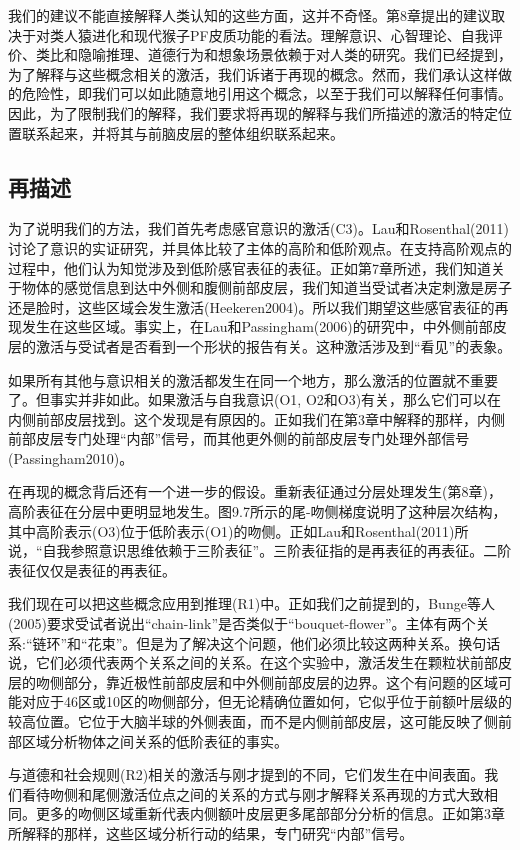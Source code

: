 我们的建议不能直接解释人类认知的这些方面，这并不奇怪。第8章提出的建议取决于对类人猿进化和现代猴子PF皮质功能的看法。理解意识、心智理论、自我评价、类比和隐喻推理、道德行为和想象场景依赖于对人类的研究。我们已经提到，为了解释与这些概念相关的激活，我们诉诸于再现的概念。然而，我们承认这样做的危险性，即我们可以如此随意地引用这个概念，以至于我们可以解释任何事情。因此，为了限制我们的解释，我们要求将再现的解释与我们所描述的激活的特定位置联系起来，并将其与前脑皮层的整体组织联系起来。

\subsection{再描述}

为了说明我们的方法，我们首先考虑感官意识的激活(C3)。Lau和Rosenthal(2011)讨论了意识的实证研究，并具体比较了主体的高阶和低阶观点。在支持高阶观点的过程中，他们认为知觉涉及到低阶感官表征的表征。正如第7章所述，我们知道关于物体的感觉信息到达中外侧和腹侧前部皮层，我们知道当受试者决定刺激是房子还是脸时，这些区域会发生激活(Heekeren2004)。所以我们期望这些感官表征的再现发生在这些区域。事实上，在Lau和Passingham(2006)的研究中，中外侧前部皮层的激活与受试者是否看到一个形状的报告有关。这种激活涉及到“看见”的表象。

如果所有其他与意识相关的激活都发生在同一个地方，那么激活的位置就不重要了。但事实并非如此。如果激活与自我意识(O1, O2和O3)有关，那么它们可以在内侧前部皮层找到。这个发现是有原因的。正如我们在第3章中解释的那样，内侧前部皮层专门处理“内部”信号，而其他更外侧的前部皮层专门处理外部信号(Passingham2010)。

在再现的概念背后还有一个进一步的假设。重新表征通过分层处理发生(第8章)，高阶表征在分层中更明显地发生。图9.7所示的尾-吻侧梯度说明了这种层次结构，其中高阶表示(O3)位于低阶表示(O1)的吻侧。正如Lau和Rosenthal(2011)所说，“自我参照意识思维依赖于三阶表征”。三阶表征指的是再表征的再表征。二阶表征仅仅是表征的再表征。

我们现在可以把这些概念应用到推理(R1)中。正如我们之前提到的，Bunge等人(2005)要求受试者说出“chain-link”是否类似于“bouquet-flower”。主体有两个关系:“链环”和“花束”。但是为了解决这个问题，他们必须比较这两种关系。换句话说，它们必须代表两个关系之间的关系。在这个实验中，激活发生在颗粒状前部皮层的吻侧部分，靠近极性前部皮层和中外侧前部皮层的边界。这个有问题的区域可能对应于46区或10区的吻侧部分，但无论精确位置如何，它似乎位于前额叶层级的较高位置。它位于大脑半球的外侧表面，而不是内侧前部皮层，这可能反映了侧前部区域分析物体之间关系的低阶表征的事实。

与道德和社会规则(R2)相关的激活与刚才提到的不同，它们发生在中间表面。我们看待吻侧和尾侧激活位点之间的关系的方式与刚才解释关系再现的方式大致相同。更多的吻侧区域重新代表内侧额叶皮层更多尾部部分分析的信息。正如第3章所解释的那样，这些区域分析行动的结果，专门研究“内部”信号。

